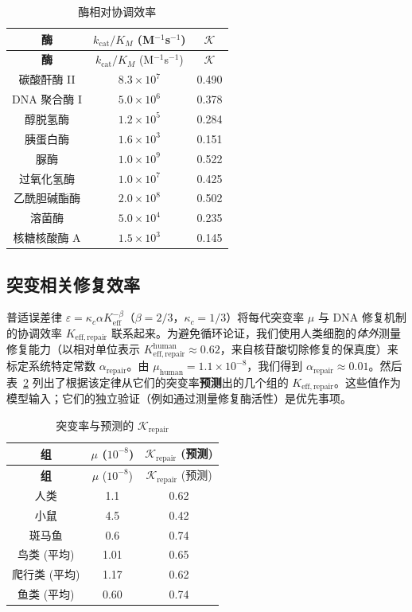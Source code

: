\documentclass[12pt,a4paper]{article}
\newcommand{\REL}{\mathcal{K}}          %
\begin{document}
	\begin{longtable}{|c|c|c|}
		\caption{酶相对协调效率}\label{tab:enzymes}\\
		\hline
		\textbf{酶} & \(k_{\mathrm{cat}}/K_M\) (M\(^{-1}\)s\(^{-1}\)) & \(\REL\) \\
		\hline
		\endfirsthead
		\hline
		\textbf{酶} & \(k_{\mathrm{cat}}/K_M\) (M\(^{-1}\)s\(^{-1}\)) & \(\REL\) \\
		\hline
		\endhead
		\hline
		碳酸酐酶 II & \(8.3\times10^7\) & 0.490 \\
		DNA 聚合酶 I & \(5.0\times10^6\) & 0.378 \\
		醇脱氢酶 & \(1.2\times10^5\) & 0.284 \\
		胰蛋白酶 & \(1.6\times10^3\) & 0.151 \\
		脲酶 & \(1.0\times10^9\) & 0.522 \\
		过氧化氢酶 & \(1.0\times10^7\) & 0.425 \\
		乙酰胆碱酯酶 & \(2.0\times10^8\) & 0.502 \\
		溶菌酶 & \(5.0\times10^4\) & 0.235 \\
		核糖核酸酶 A & \(1.5\times10^3\) & 0.145 \\
		\hline
	\end{longtable}
	
	\subsection{突变相关修复效率}
	\label{sec:mutations}
	普适误差律 \(\varepsilon = \kappa_c \alpha K_{\mathrm{eff}}^{-\beta}\)（\(\beta=2/3\)，\(\kappa_c=1/3\)）将每代突变率 \(\mu\) 与 DNA 修复机制的协调效率 \(K_{\mathrm{eff,repair}}\) 联系起来。为避免循环论证，我们使用人类细胞的\textit{体外}测量修复能力（以相对单位表示 \(K_{\mathrm{eff,repair}}^{\mathrm{human}} \approx 0.62\)，来自核苷酸切除修复的保真度）来标定系统特定常数 \(\alpha_{\mathrm{repair}}\)。由 \(\mu_{\mathrm{human}}=1.1\times10^{-8}\)，我们得到 \(\alpha_{\mathrm{repair}} \approx 0.01\)。然后表~\ref{tab:mutations} 列出了根据该定律从它们的突变率\textbf{预测}出的几个组的 \(K_{\mathrm{eff,repair}}\)。这些值作为模型输入；它们的独立验证（例如通过测量修复酶活性）是优先事项。
	
	\begin{longtable}{|c|c|c|}
		\caption{突变率与预测的 \(\REL_{\mathrm{repair}}\)}\label{tab:mutations}\\
		\hline
		\textbf{组} & \(\mu\) (\(10^{-8}\)) & \(\REL_{\mathrm{repair}}\) (预测) \\
		\hline
		\endfirsthead
		\hline
		\textbf{组} & \(\mu\) (\(10^{-8}\)) & \(\REL_{\mathrm{repair}}\) (预测) \\
		\hline
		\endhead
		\hline
		人类 & 1.1 & 0.62 \\
		小鼠 & 4.5 & 0.42 \\
		斑马鱼 & 0.6 & 0.74 \\
		鸟类 (平均) & 1.01 & 0.65 \\
		爬行类 (平均) & 1.17 & 0.62 \\
		鱼类 (平均) & 0.60 & 0.74 \\
		\hline
	\end{longtable}
	
\end{document}
